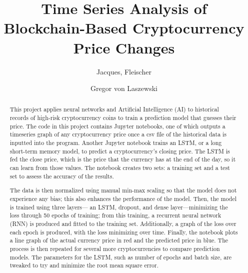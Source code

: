 \documentclass[acmtog,authorversion]{acmart}
\newcommand{\TODO}[2]{\todo[inline]{#1: #2}}
\begin{document}
\title{Time Series Analysis of Blockchain-Based Cryptocurrency Price Changes}

\author{Jacques, Fleischer}

\author{Gregor von Laszewski}



\renewcommand{\shortauthors}{TBD, von Laszewski, et.al.}


\begin{abstract}
\TODO{jp}{do not use this project}
  This project applies neural networks and Artificial Intelligence (AI) to historical records of high-risk cryptocurrency coins to train a prediction model that guesses their price. The code in this project contains Jupyter notebooks, one of which outputs a timeseries graph of any cryptocurrency price once a csv file of the historical data is inputted into the program. Another Jupyter notebook trains an LSTM, or a long short-term memory model, to predict a cryptocurrency's closing price. The LSTM is fed the close price, which is the price that the currency has at the end of the day, so it can learn from those values. The notebook creates two sets: a training set and a test set to assess the accuracy of the results.

The data is then normalized using manual min-max scaling so that the model does not experience any bias; this also enhances the performance of the model. Then, the model is trained using three layers— an LSTM, dropout, and dense layer—minimizing the loss through 50 epochs of training; from this training, a recurrent neural network (RNN) is produced and fitted to the training set. Additionally, a graph of the loss over each epoch is produced, with the loss minimizing over time. Finally, the notebook plots a line graph of the actual currency price in red and the predicted price in blue. The process is then repeated for several more cryptocurrencies to compare prediction models. The parameters for the LSTM, such as number of epochs and batch size, are tweaked to try and minimize the root mean square error.
\end{abstract}
\end{document}
